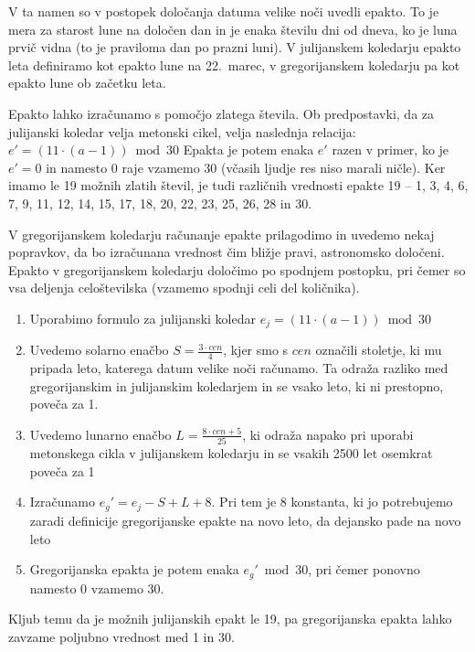 
V ta namen so v postopek določanja datuma velike noči uvedli epakto. To je 
mera za starost lune na določen dan in je enaka številu dni od dneva, ko je 
luna prvič vidna (to je praviloma dan po prazni luni).
V julijanskem koledarju epakto leta definiramo kot epakto lune na 22.\ marec,
v gregorijanskem koledarju pa kot epakto lune ob začetku leta. 

Epakto lahko izračunamo s pomočjo zlatega števila.
Ob predpostavki, da za julijanski koledar velja metonski cikel, velja 
naslednja relacija: $e' = (11 \cdot (a - 1)) \bmod 30$
Epakta je potem enaka $e'$ razen v primer, ko je $e' = 0$ in namesto 0 raje 
vzamemo 30 (včasih ljudje res niso marali ničle).
Ker imamo le 19 možnih zlatih števil, je tudi različnih vrednosti epakte 19 
-- 1, 3, 4, 6, 7, 9, 11, 12, 14, 15, 17, 18, 20, 22, 23, 25, 26, 28 in 30.


V gregorijanskem koledarju računanje epakte prilagodimo in uvedemo nekaj 
popravkov, da bo izračunana vrednost čim bližje pravi, astronomsko določeni. 
Epakto v gregorijanskem koledarju določimo po spodnjem postopku, pri čemer so
vsa deljenja celoštevilska (vzamemo spodnji celi del količnika).
\begin{enumerate}
   \item Uporabimo formulo za julijanski koledar $e_j = (11 \cdot (a - 1)) \bmod 30$
   \item Uvedemo solarno enačbo $S = \frac{3 \cdot cen}{4}$, kjer smo s $cen$
      označili stoletje, ki mu pripada leto, katerega datum velike noči 
      računamo. Ta odraža razliko med gregorijanskim in julijanskim koledarjem
      in se vsako leto, ki ni prestopno, poveča za 1.
   \item Uvedemo lunarno enačbo $L = \frac{8 \cdot cen + 5}{25}$, ki odraža
      napako pri uporabi metonskega cikla v julijanskem koledarju in se vsakih
      2500 let osemkrat poveča za 1
   \item Izračunamo $e_g' = e_j - S + L + 8$. Pri tem je 8 konstanta, ki 
      jo potrebujemo zaradi definicije gregorijanske epakte na novo leto, da dejansko pade na novo leto
   \item Gregorijanska epakta je potem enaka $e_g' \bmod 30$, pri čemer ponovno
      namesto 0 vzamemo 30.
\end{enumerate}
Kljub temu da je možnih julijanskih epakt le 19, pa gregorijanska epakta lahko
zavzame poljubno vrednost med 1 in 30.


